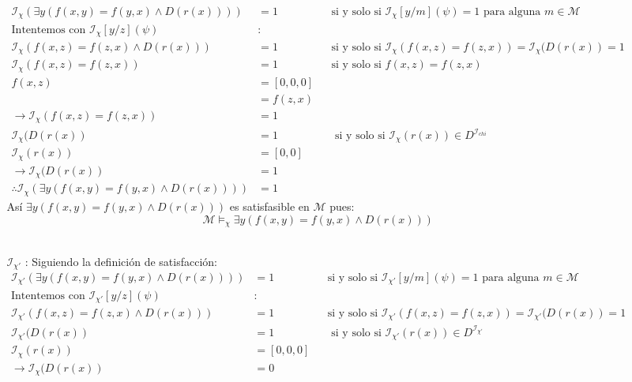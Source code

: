 \documentclass[8pt, letterpaper]{article}
\begin{document}
\begin{enumerate}
\begin{enumerate}
\begin{itemize}
      \begin{align*}
        \mathcal{I}_\chi(\exists y(f(x,y) = f(y,x)\land D(r(x)))) &= 1 & &\text{si y solo si }\mathcal{I}_\chi[y/m](\psi) = 1 \text{ para alguna } m \in \mathcal{M}\\
        \text{Intentemos con }\mathcal{I}_\chi[y/z](\psi)&:\\
        \mathcal{I}_\chi(f(x,z) = f(z,x)\land D(r(x))) &= 1 & &\text{si y solo si } \mathcal{I}_\chi(f(x,z) = f(z,x)) = \mathcal{I}_\chi(D(r(x)) = 1\\
        \mathcal{I}_\chi(f(x,z) = f(z,x)) &= 1 & &\text{si y solo si } f(x,z) = f(z,x)\\
        f(x,z) &= [0,0,0]\\
        &= f(z, x)\\
        \rightarrow \mathcal{I}_\chi(f(x,z) = f(z,x)) &= 1\\
        \mathcal{I}_\chi(D(r(x)) &= 1 & &\text{ si y solo si } \mathcal{I}_\chi(r(x))\in D^{\mathcal{I}_{chi}}\\
        \mathcal{I}_\chi(r(x)) &= [0,0] \\
        \rightarrow \mathcal{I}_\chi(D(r(x)) &= 1\\
        \therefore \mathcal{I}_\chi(\exists y(f(x,y) = f(y,x)\land D(r(x)))) &= 1
      \end{align*}
      Así $\exists y(f(x,y) = f(y,x)\land D(r(x)))$ es satisfasible en $\mathcal{M}$ pues:
      $$\mathcal{M} \models_\chi \exists y(f(x,y) = f(y,x)\land D(r(x)))$$
      \\
    \item[$\mathcal{I}_{\chi'}$]:
      Siguiendo la definición de satisfacción:
      \begin{align*}
        \mathcal{I}_{\chi'}(\exists y(f(x,y) = f(y,x)\land D(r(x)))) &= 1 & &\text{si y solo si }\mathcal{I}_{\chi'}[y/m](\psi) = 1 \text{ para alguna } m \in \mathcal{M}\\
        \text{Intentemos con }\mathcal{I}_{\chi'}[y/z](\psi)&:\\
        \mathcal{I}_{\chi'}(f(x,z) = f(z,x)\land D(r(x))) &= 1 & &\text{si y solo si } \mathcal{I}_{\chi'}(f(x,z) = f(z,x)) = \mathcal{I}_{\chi'}(D(r(x)) = 1\\
        \mathcal{I}_{\chi'}(D(r(x)) &= 1 & &\text{ si y solo si } \mathcal{I}_{\chi'}(r(x))\in D^{\mathcal{I}_{\chi'}}\\
        \mathcal{I}_\chi(r(x)) &= [0,0,0] \\
        \rightarrow \mathcal{I}_\chi(D(r(x)) &= 0\\

\end{align*}
\end{itemize}
\end{enumerate}
\end{enumerate}
\end{document}
